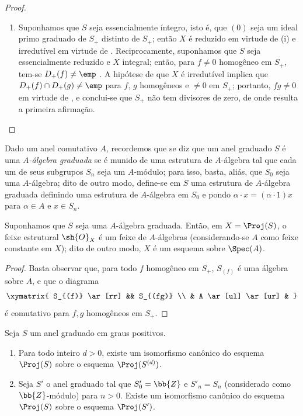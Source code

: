 \documentclass[oneside,10pt]{amsart}
\newcommand{\oldpage}[2][]{\marginnote{\normalfont\footnotesize\textbf{#1}~|~#2}\ignorespaces}
\let\EGAOriginalLabel\label
\renewcommand{\label}[1]{\phantomsection\EGAOriginalLabel{#1}}
\begin{document}
\begin{proof}
\begin{enumerate}
  \item[\rm(ii)] Suponhamos que $S$ seja essencialmente íntegro, isto é, que $(0)$ seja um ideal primo graduado de $S_+$ distinto de $S_+$; então $X$ é reduzido em virtude de (i) e irredutível em virtude de .
  Reciprocamente, suponhamos que $S$ seja essencialmente reduzido e $X$ integral; então, para $f\neq0$ homogêneo em $S_+$, tem-se $D_+(f)\neq\emp$ .
  A hipótese de que $X$ é irredutível implica que $D_+(f)\cap D_+(g)\neq\emp$ para $f$, $g$ homogêneos e $\neq0$ em $S_+$; portanto, $fg\neq0$ em virtude de , e conclui-se que $S_+$ não tem divisores de zero, de onde resulta a primeira afirmação.
\end{enumerate}
\end{proof}

\begin{env}[2.4.5]
\label{II.2.4.5}
Dado um anel comutativo $A$, recordemos que se diz que um anel graduado $S$ é uma \emph{$A$-álgebra graduada} se é munido de uma estrutura de $A$-álgebra tal que cada um de seus subgrupos $S_n$ seja um $A$-módulo; para isso, basta, aliás, que $S_0$ seja
\oldpage[II]{30}
uma $A$-álgebra; dito de outro modo, define-se em $S$ uma estrutura de $A$-álgebra graduada definindo uma estrutura de $A$-álgebra em $S_0$ e pondo $\alpha\cdot x=(\alpha\cdot1)x$ para $\alpha\in A$ e $x\in S_n$.
\end{env}

\begin{proposition}[2.4.6]
\label{II.2.4.6}
Suponhamos que $S$ seja uma $A$-álgebra graduada.
Então, em $X=\Proj(S)$, o feixe estrutural $\sh{O}_X$ é um feixe de $A$-álgebras (considerando-se $A$ como feixe constante em $X$); dito de outro modo, $X$ é um esquema sobre $\Spec(A)$.
\end{proposition}

\begin{proof}
Basta observar que, para todo $f$ homogêneo em $S_+$, $S_{(f)}$ é uma álgebra sobre $A$, e que o diagrama
\[
  \xymatrix{
    S_{(f)} \ar[rr] && S_{(fg)}
  \\ & A \ar[ul] \ar[ur] &
  }
\]
é comutativo para $f,g$ homogêneos em $S_+$.
\end{proof}

\begin{proposition}[2.4.7]
\label{II.2.4.7}
Seja $S$ um anel graduado em graus positivos.
\begin{enumerate}
  \item[\rm(i)] Para todo inteiro $d>0$, existe um isomorfismo canônico do esquema $\Proj(S)$ sobre o esquema $\Proj(S^{(d)})$.
  \item[\rm(ii)] Seja $S'$ o anel graduado tal que $S'_0=\bb{Z}$ e $S'_n=S_n$ (considerado como $\bb{Z}$-módulo) para $n>0$. Existe um isomorfismo canônico do esquema $\Proj(S)$ sobre o esquema $\Proj(S')$.
\end{enumerate}
\end{proposition}
\end{document}

